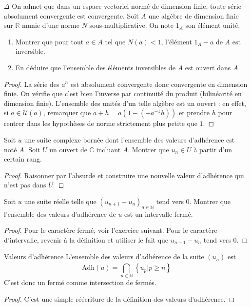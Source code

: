 \documentclass[french,a4paper]{article}
\newcommand{\N}{\mathbb{N}}
\newcommand{\R}{\mathbb{R}}
\newcommand{\C}{\mathbb{C}}
\newcommand{\inv}{^{-1}}
\theoremstyle{plain}
\theoremstyle{definition}
\theoremstyle{remark}
\begin{document}
\begin{ex}{$\Delta$}
	On admet que dans un espace vectoriel normé de dimension finie, toute série absolument convergente est convergente. Soit $A$ une algèbre de dimension finie sur $\R$ munie d'une norme $N$ sous-multiplicative. On note $1_A$ son élément unité.
	\begin{enumerate}
		\item Montrer que pour tout $a\in A$ tel que $N(a)<1$, l'élément $1_A-a$ de $A$ est inversible.
		\item En déduire que l'ensemble des éléments inversibles de $A$ est ouvert dans $A$.
	\end{enumerate}
\end{ex}
\begin{proof}
	La série des $a^n$ est absolument convergente donc convergente en dimension finie. On vérifie que c'est bien l'inverse par continuité du produit (bilinéarité en dimension finie). L'ensemble des unités d'un telle algèbre est un ouvert : en effet, si $a\in\mathcal{U}(a)$, remarquer que $a+h=a(1-(-a\inv h))$ et prendre $h$ pour rentrer dans les hypothèses de norme strictement plus petite que $1$.
\end{proof}

\begin{ex}{}
	Soit $u$ une suite complexe bornée dont l'ensemble des valeurs d'adhérence est noté $A$. Soit $U$ un ouvert de $\C$ incluant $A$. Montrer que $u_n\in U$ à partir d'un certain rang.
\end{ex}
\begin{proof}
	Raisonner par l'absurde et construire une nouvelle valeur d'adhérence qui n'est pas dans $U$.
\end{proof}

\begin{ex}{}
	Soit $u$ une suite réelle telle que $(u_{n+1}-u_n)_{n\in\N}$ tend vers $0$. Montrer que l'ensemble des valeurs d'adhérence de $u$ est un intervalle fermé.
\end{ex}
\begin{proof}
	Pour le caractère fermé, voir l'exercice suivant. Pour le caractère d'intervalle, revenir à la définition et utiliser le fait que $u_{n+1}-u_n$ tend vers $0$.
\end{proof}

\begin{ex}{Valeurs d'adhérence} L'ensemble des valeurs d'adhérence de la suite $(u_n)$ est $$\text{Adh}(u)=\bigcap_{n\in\N}\overline{\left\{u_p|p\geqslant n\right\}}$$ C'est donc un fermé comme intersection de fermés.
\end{ex}
\begin{proof}
	C'est une simple réécriture de la définition des valeurs d'adhérence.
\end{proof}
\end{document}
